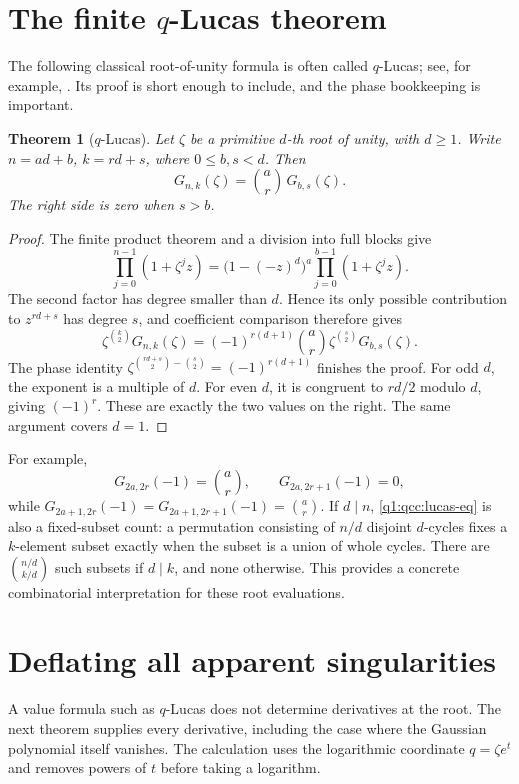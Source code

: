 \documentclass[11pt,a4paper,oneside,openany]{book}
\newtheorem{theorem}{Theorem}[chapter]
\theoremstyle{definition}
\theoremstyle{remark}
\newcommand{\qbname}{\texorpdfstring{$q$}{q}}
\begin{document}
\section{The finite \qbname-Lucas theorem}
The following classical root-of-unity formula is often called \(q\)-Lucas;
see, for example, \cite{formichella}. Its proof is short enough to
include, and the phase bookkeeping is important.

\begin{theorem}[\(q\)-Lucas]\label{q1:qcc:lucas}
Let \(\zeta\) be a primitive \(d\)-th root of unity, with \(d\ge1\).
Write \(n=ad+b\), \(k=rd+s\), where \(0\le b,s<d\). Then
\begin{equation}\label{q1:qcc:lucas-eq}
 G_{n,k}(\zeta)=\binom ar\,G_{b,s}(\zeta).
\end{equation}
The right side is zero when \(s>b\).
\end{theorem}
\begin{proof}
The finite product theorem and a division into full blocks give
\[
 \prod_{j=0}^{n-1}(1+\zeta^jz)
 =\bigl(1-(-z)^d\bigr)^a
       \prod_{j=0}^{b-1}(1+\zeta^jz).
\]
The second factor has degree smaller than \(d\). Hence its only possible
contribution to \(z^{rd+s}\) has degree \(s\), and coefficient comparison
therefore gives
\[
 \zeta^{\binom k2}G_{n,k}(\zeta)
 =(-1)^{r(d+1)}\binom ar
           \zeta^{\binom s2}G_{b,s}(\zeta).
\]
The phase identity
\(\zeta^{\binom{rd+s}{2}-\binom s2}=(-1)^{r(d+1)}\)
finishes the proof. For odd \(d\), the exponent is a multiple of \(d\).
For even \(d\), it is congruent to \(rd/2\) modulo \(d\), giving
\((-1)^r\). These are exactly the two values on the right.
The same argument covers \(d=1\).
\end{proof}

For example,
\[
 G_{2a,2r}(-1)=\binom ar,\qquad G_{2a,2r+1}(-1)=0,
\]
while \(G_{2a+1,2r}(-1)=G_{2a+1,2r+1}(-1)=\binom ar\).
If \(d\mid n\), \eqref{q1:qcc:lucas-eq} is also a fixed-subset count: a
permutation consisting of \(n/d\) disjoint \(d\)-cycles fixes a
\(k\)-element subset exactly when the subset is a union of whole cycles.
There are \(\binom{n/d}{k/d}\) such subsets if \(d\mid k\), and none
otherwise. This provides a concrete combinatorial interpretation for these
root evaluations.

\section{Deflating all apparent singularities}
A value formula such as \(q\)-Lucas does not determine derivatives at the
root. The next theorem supplies every derivative, including the case where the
Gaussian polynomial itself vanishes. The calculation uses the logarithmic
coordinate \(q=\zeta e^t\) and removes powers of \(t\) before taking a
logarithm.
\end{document}
